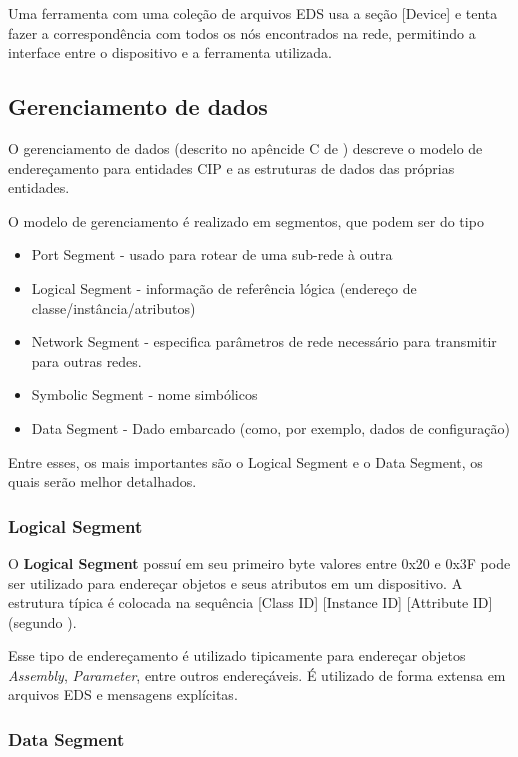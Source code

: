  Uma ferramenta com uma coleção de arquivos EDS usa a seção [Device] e tenta fazer a correspondência com todos os nós encontrados na rede, permitindo a interface entre o dispositivo e a ferramenta utilizada.
 
 \subsection{Gerenciamento de dados}
 
 O gerenciamento de dados (descrito no apêncide C de \cite{cip1}) descreve o modelo de endereçamento para entidades CIP e as estruturas de dados das próprias entidades.
 
 O modelo de gerenciamento é realizado em segmentos, que podem ser do tipo
 
 \begin{itemize}
 \item Port Segment - usado para rotear de uma sub-rede à outra
 \item Logical Segment - informação de referência lógica (endereço de classe/instância/atributos)
 \item Network Segment - especifica parâmetros de rede necessário para transmitir para outras redes.
 \item Symbolic Segment - nome simbólicos
 \item Data Segment - Dado embarcado (como, por exemplo, dados de configuração)
 \end{itemize}
 
 Entre esses, os mais importantes são o Logical Segment e o Data Segment, os quais serão melhor detalhados.

\subsubsection{Logical Segment}

 O {\bf Logical Segment} possuí em seu primeiro byte valores entre 0x20 e 0x3F pode ser utilizado para endereçar objetos e seus atributos em um dispositivo. A estrutura típica é colocada na sequência [Class ID] [Instance ID] [Attribute ID] (segundo \cite{book:zur}).

Esse tipo de endereçamento é utilizado tipicamente para endereçar objetos {\it Assembly}, {\it Parameter}, entre outros endereçáveis. É utilizado de forma extensa em arquivos EDS e mensagens explícitas.

\subsubsection{Data Segment}

